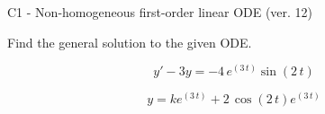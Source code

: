 \begin{exercise}
  \begin{exerciseTitle}C1 - Non-homogeneous first-order linear ODE (ver. 12)\end{exerciseTitle}
  \begin{exerciseStatement}
    
Find the general solution to the given ODE.

    
\[y'-3y= -4 \, e^{\left(3 \, t\right)} \sin\left(2 \, t\right)\]

  \end{exerciseStatement}
  \begin{exerciseAnswer}
    
\[y= k e^{\left(3 \, t\right)} + 2 \, \cos\left(2 \, t\right) e^{\left(3 \, t\right)}\]

  \end{exerciseAnswer}
\end{exercise}